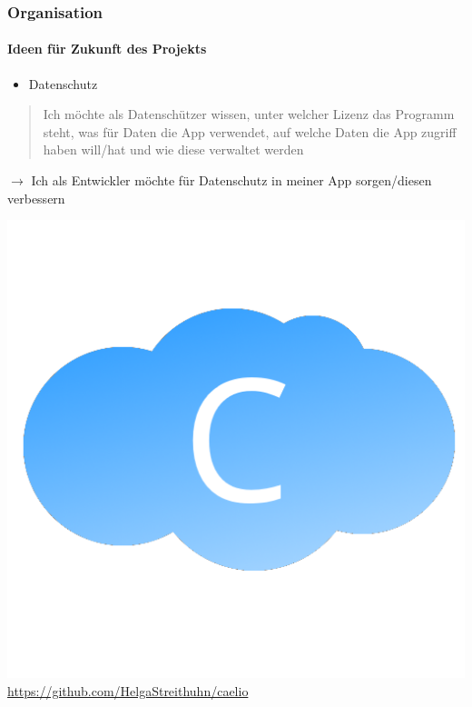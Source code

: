 \documentclass[notes]{beamer}
\begin{document}
	\begin{frame}
		\frametitle{Organisation}
		\framesubtitle{Ideen für Zukunft des Projekts}
		\begin{itemize}
			\item Datenschutz
		\end{itemize}
	\end{frame}
	\note
	{
		\begin{quote}
			Ich möchte als Datenschützer wissen, unter welcher Lizenz das Programm steht, was für Daten die App verwendet, auf welche Daten die App zugriff haben will/hat und wie diese verwaltet werden
		\end{quote}
		$\rightarrow$ Ich als Entwickler möchte für Datenschutz in meiner App sorgen/diesen verbessern
	}
	\begin{frame}
		\thispagestyle{empty}
		\centering
		\includegraphics[height = .5\textheight]{../../Anwendung/Icons/caelio}
		\url{https://github.com/HelgaStreithuhn/caelio}
	\end{frame}
\end{document}
